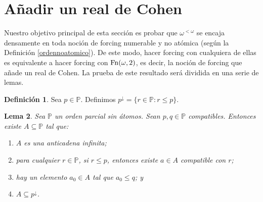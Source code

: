 \documentclass[11pt]{unam_tesis1}
\theoremstyle{MyThmStyle}
\theoremstyle{definition}
\newtheorem{definition}{Definici\'on}[chapter]
\theoremstyle{plain}
\newtheorem{lemma}[definition]{Lema}
\theoremstyle{remark}
\let\leq\leqslant
\begin{document}
\section{A\~nadir un real de Cohen}

Nuestro objetivo principal de esta secci\'on es probar que $\omega^{<\omega}$ se encaja densamente en toda noci\'on de forcing numerable y no at\'omica (seg\'un la Definici\'on \ref{ordennoatomico}). De este modo, hacer forcing con cualquiera de ellas es equivalente a hacer forcing con $\rm {Fn}(\omega,2)$, es decir, la noci\'on de forcing que a\~nade un real de Cohen. La prueba de este resultado ser\'a dividida en una serie de lemas.

\begin{definition}
Sea $p\in \mathbb P$. Definimos $p^{\downarrow}=\{r\in \mathbb P:r\leq p\}$.
\end{definition}

\begin{lemma}\label{anticadenas}
Sea $\mathbb P$ un orden parcial sin \'atomos. Sean $p,q\in \mathbb P$ compatibles. Entonces existe $A\subseteq \mathbb P$ tal que:

\begin{enumerate}

\item $A$ es una anticadena infinita;
\item para cualquier $r\in \mathbb P$, si $r\leq p$, entonces existe $a\in A$ compatible con $r$;
\item hay un elemento $a_{0}\in A$ tal que $a_{0}\leq q$; y
\item $A\subseteq p^{\downarrow}$.

\end{enumerate}
\end{lemma}
\end{document}
